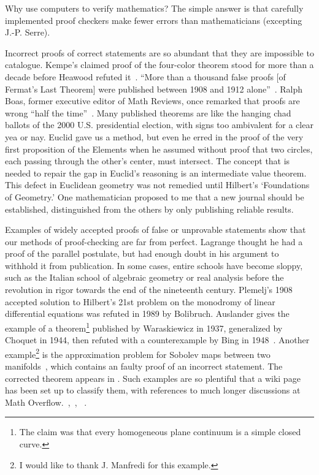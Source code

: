 \documentclass{llncs}
\begin{document}
Why use computers to verify mathematics?  The simple answer is that
carefully implemented proof checkers make fewer errors than 
mathematicians (excepting J.-P. Serre).

Incorrect proofs of correct statements are so abundant that they are
impossible to catalogue.  Kempe's claimed proof of the four-color
theorem stood for more than a decade before Heawood refuted
it~\cite[p.~115]{Mac}.  ``More than a thousand false proofs [of
Fermat's Last Theorem] were published between 1908 and 1912
alone''~\cite{Corry}.  Ralph Boas, former executive editor of Math
Reviews, once remarked that proofs are wrong ``half the
time''~\cite{Aus}.  Many published theorems are like the hanging chad
ballots of the 2000 U.S. presidential election, with signs too
ambivalent for a clear yea or nay.  Euclid gave us a method, but even
he erred in the proof of the very first proposition of the Elements
when he assumed without proof that two circles, each passing through
the other's center, must intersect.  The concept that is needed to
repair the gap in Euclid's reasoning is an intermediate value theorem.
This defect in Euclidean geometry was not remedied until Hilbert's
`Foundations of Geometry.'  One mathematician proposed to me that a
new journal should be established, distinguished from the others by
only publishing reliable results.


Examples of widely accepted proofs of false or unprovable statements
show that our methods of proof-checking are far from perfect.    Lagrange
thought he had a proof of the parallel postulate, but had enough doubt
in his argument to withhold it from publication.  In some cases,
entire schools have become sloppy, such as the Italian school of
algebraic geometry or real analysis before the revolution in rigor
towards the end of the nineteenth century.  Plemelj's 1908 accepted
solution to Hilbert's 21st problem on the monodromy of linear
differential equations was refuted in 1989 by Bolibruch.  Auslander
gives the example of a theorem\footnote{The claim was that every
  homogeneous plane continuum is a simple closed curve.}  published by
Waraskiewicz in 1937, generalized by Choquet in 1944, then refuted
with a counterexample by Bing in 1948~\cite{Aus}.  Another
example\footnote{I would like to thank J. Manfredi for this example.}
is the approximation problem for Sobolev maps between two
manifolds~\cite{Bethuel}, which contains an faulty proof of an
incorrect statement.  The corrected theorem appears in \cite{Hang}.
Such examples are so plentiful that a wiki
page has been set up to classify them, with references to much longer discussions
at Math Overflow.~\cite{WikiPIP},~\cite{Over1}, ~\cite{Over2}.
\end{document}
